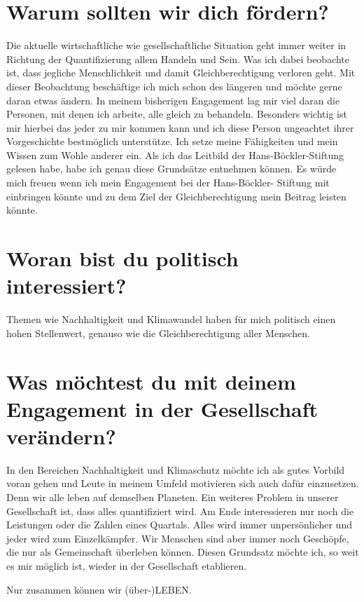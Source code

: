 \documentclass[12pt]{scrreprt}
\begin{document}
\section*{Warum sollten wir dich fördern?}
Die aktuelle wirtschaftliche wie gesellschaftliche Situation geht immer weiter in Richtung der
Quantifizierung allem Handeln und Sein. Was ich dabei beobachte ist, dass jegliche Menschlichkeit
und damit Gleichberechtigung verloren geht. Mit dieser Beobachtung beschäftige ich mich
schon des längeren und möchte gerne daran etwas ändern. In meinem bisherigen Engagement
lag mir viel daran die Personen, mit denen ich arbeite, alle gleich zu behandeln. Besonders
wichtig ist mir hierbei das jeder zu mir kommen kann und ich diese Person ungeachtet ihrer
Vorgeschichte bestmöglich unterstütze. Ich setze meine Fähigkeiten und mein Wissen zum
Wohle anderer ein.
Als ich das Leitbild der Hans-Böckler-Stiftung gelesen habe, habe ich genau diese Grundsätze
entnehmen können. Es würde mich freuen wenn ich mein Engagement bei der Hans-Böckler-
Stiftung mit einbringen könnte und zu dem Ziel der Gleichberechtigung mein Beitrag leisten
könnte.
\section*{Woran bist du politisch interessiert?}
Themen wie Nachhaltigkeit und Klimawandel haben für mich politisch einen hohen Stellenwert,
genauso wie die Gleichberechtigung aller Menschen.
\section*{Was möchtest du mit deinem Engagement in der Gesellschaft verändern?}
In den Bereichen Nachhaltigkeit und Klimaschutz möchte ich als gutes Vorbild voran gehen
und Leute in meinem Umfeld motivieren sich auch dafür einzusetzen. Denn wir alle leben auf
demselben Planeten. Ein weiteres Problem in unserer Gesellschaft ist, dass alles quantifiziert
wird. Am Ende interessieren nur noch die Leistungen oder die Zahlen eines Quartals. Alles wird
immer unpersönlicher und jeder wird zum Einzelkämpfer. Wir Menschen sind aber immer noch
Geschöpfe, die nur als Gemeinschaft überleben können. Diesen Grundsatz möchte ich, so weit
es mir möglich ist, wieder in der Gesellschaft etablieren.

Nur zusammen können wir (über-)LEBEN.
\end{document}
